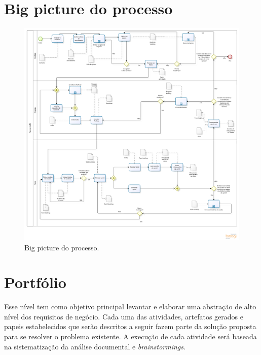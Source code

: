\section{Big picture do processo}
  \begin{figure}[!htbp]
    \centering
    \includegraphics[scale=0.3]{figuras/Processo_v1-2}
    \caption[Big picture do processo.]{Big picture do processo. \footnotemark}
    \label{processo}
  \end{figure}

\section{Portfólio}
Esse nível tem como objetivo principal levantar e elaborar uma abstração de alto nível dos requisitos de negócio. Cada uma das atividades, artefatos gerados e papeis estabelecidos que serão descritos a seguir fazem parte da solução proposta para se resolver o problema existente. A execução de cada atividade será baseada na sistematização da análise documental e \textit{brainstormings}.

